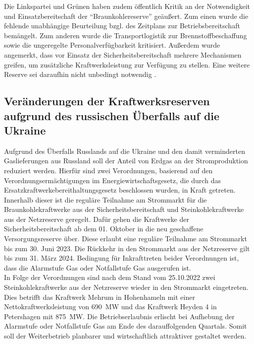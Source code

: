 			Die Linkspartei und Grünen haben zudem öffentlich Kritik an der Notwendigkeit und Einsatzbereitschaft der "`Braunkohlereserve"' geäußert.
			Zum einen wurde die fehlende unabhängige Beurteilung bzgl. des Zeitplans zur Betriebsbereitschaft bemängelt.
			Zum anderen wurde die Transportlogistik zur Brennstoffbeschaffung sowie die ungeregelte Personalverfügbarkeit kritisiert.
			Außerdem wurde angemerkt, dass vor Einsatz der Sicherheitsbereitschaft mehrere Mechanismen greifen, um zusätzliche Kraftwerksleistung zur Verfügung zu stellen.
			Eine weitere Reserve sei daraufhin nicht unbedingt notwendig \cite{Netz_Kapa_Reserve_NextKraftwerke}.
			
		
	\subsection{Veränderungen der Kraftwerksreserven aufgrund des russischen Überfalls auf die Ukraine}
	
		Aufgrund des Überfalls Russlands auf die Ukraine und den damit verminderten Gaslieferungen aus Russland soll der Anteil von Erdgas an der Stromproduktion reduziert werden.
		Hierfür sind zwei Verordnungen, basierend auf den Verordnungsermächtigungen im Energiewirtschaftsgesetz, die durch das Ersatzkraftwerkebereithaltungsgesetz beschlossen wurden, in Kraft getreten.
		Innerhalb dieser ist die reguläre Teilnahme am Strommarkt für die Braunkohlekraftwerke aus der Sicherheitsbereitschaft und Steinkohlekraftwerke aus der Netzreserve geregelt.
		Dafür gehen die Kraftwerke der Sicherheitsbereitschaft ab dem 01. Oktober in die neu geschaffene Versorgungsreserve über.
		Diese erlaubt eine reguläre Teilnahme am Strommarkt bis zum 30. Juni 2023.
		Die Rückkehr in den Strommarkt aus der Netzreserve gilt bis zum 31. März 2024.
		Bedingung für Inkrafttreten beider Verordnungen ist, dass die Alarmstufe Gas oder Notfallstufe Gas ausgerufen ist. \\
		
		In Folge der Verordnungen sind nach dem Stand vom 25.10.2022 zwei Steinkohlekraftwerke aus der Netzreserve wieder in den Strommarkt eingetreten.
		Dies betrifft das Kraftwerk Mehrum in Hohenhameln mit einer Nettokraftwerksleistung von \SI{690}{\mega\watt} und das Kraftwerk Heyden 4 in Petershagen mit \SI{875}{\mega\watt}.
		Die Betriebserlaubnis erlischt bei Aufhebung der Alarmstufe oder Notfallstufe Gas am Ende des darauffolgenden Quartals.
		Somit soll der Weiterbetrieb planbarer und wirtschaftlich attraktiver gestaltet werden.
		
		
		
\clearpage
	